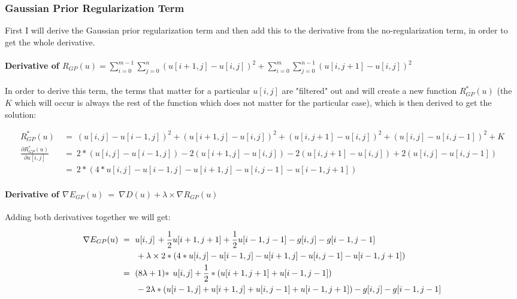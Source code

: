 \documentclass{report}
\begin{document}
			\subsubsection{Gaussian Prior Regularization Term}
			\startsubsection
				First I will derive the Gaussian prior regularization term and then add this to the derivative from the no-regularization term, in order to get the whole derivative.
				\vspace{-0.4cm} \paragraph{Derivative of $R_{GP}(u) = \sum_{i=0}^{m-1} \sum_{j=0}^{n} ( u[i+1,j] - u[i,j] )^2 + \sum_{i=0}^{m} \sum_{j=0}^{n-1} ( u[i,j+1] - u[i,j] )^2$}
				\startsubsection
					\vspace{0.2cm} In order to derive this term, the terms that matter for a particular $u[i,j]$ are "filtered" out and will create a new function $R_{GP}^*(u)$ (the $K$ which will occur is always the rest of the function which does not matter for the particular case), which is then derived to get the solution:
				\closesection
				\begin{adjustwidth}{-4em}{}
					\vspace{-0.5cm}
					\begin{align*}
						R_{GP}^*(u) \ & = \ (u[i,j] - u[i-1,j])^2 + (u[i+1,j] - u[i,j])^2 + (u[i,j+1] - u[i,j])^2 + (u[i,j] - u[i,j-1])^2 + K \\
						\frac{\partial R_{GP}^*(u)}{\partial u[i,j]} \ & = \ 2 * (u[i,j] - u[i-1,j]) - 2 (u[i+1,j] - u[i,j]) - 2 (u[i,j+1] - u[i,j]) + 2 (u[i,j] - u[i,j-1]) \\
						& = \ 2 * (4 * u[i,j] - u[i-1,j] - u[i+1,j] - u[i,j-1] - u[i-1,j+1])
					\end{align*}
				\end{adjustwidth}
				\vspace{-0.4cm} \paragraph{Derivative of $\nabla E_{GP}(u) \ = \ \nabla D(u) + \lambda \times \nabla R_{GP}(u)$}
				\startsubsection
					Adding both derivatives together we will get:
					\begin{adjustwidth}{-4em}{}
						\vspace{-0.5cm}
						\begin{align*}
							\nabla E_{GP}(u) \ & = \ u[i,j]  && \hspace{-0.9cm} + \frac{1}{2} u[i+1,j+1] + \frac{1}{2} u[i-1,j-1] - g[i,j] - g[i-1,j-1] \\
							&&& \hspace{-1.75cm} + \lambda \times 2 * (4 * u[i,j] - u[i-1,j] - u[i+1,j] - u[i,j-1] - u[i-1,j+1]) \\
							& = \ (8\lambda + 1) * && \hspace{-0.2cm} u[i,j] + \frac{1}{2} * (u[i+1,j+1] + u[i-1,j-1]) \\
							&&& \hspace{-1.75cm} - 2\lambda * (u[i-1,j] + u[i+1,j] + u[i,j-1] + u[i-1,j+1]) - g[i,j] - g[i-1,j-1]
						\end{align*}
					\end{adjustwidth}
\end{document}
